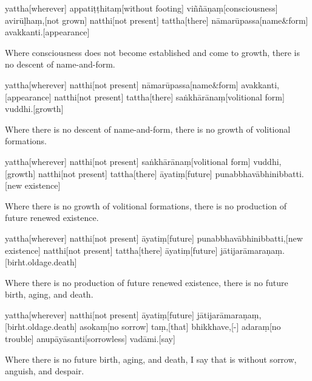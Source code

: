 \begin{samepage}
\begingl[glneveryline={\PaliGlossA,\PaliGlossB}]
yattha[wherever] appatiṭṭhitaṃ[without footing] viññāṇaṃ[consciousness] avirūḷhaṃ,[not grown] natthi[not present] tattha[there] nāmarūpassa[name\&form] avakkanti.[appearance]
\endgl
\nopagebreak
\linespread{0.5}
\begin{spacin}{0.2}
{\PaliGlossFT Where consciousness does not become established and come to growth, there is no descent of name-and-form.}
\end{spacin}
\vskip 12pt
\end{samepage}
\begin{samepage}
\begingl[glneveryline={\PaliGlossA,\PaliGlossB}]
yattha[wherever] natthi[not present] nāmarūpassa[name\&form] avakkanti,[appearance] natthi[not present] tattha[there] saṅkhārānaṃ[volitional form] vuddhi.[growth]
\endgl
\nopagebreak
\linespread{0.5}
\begin{spacin}{0.2}
{\PaliGlossFT Where there is no descent of name-and-form, there is no growth of volitional formations.}
\end{spacin}
\vskip 12pt
\end{samepage}
\begin{samepage}
\begingl[glneveryline={\PaliGlossA,\PaliGlossB}]
yattha[wherever] natthi[not present] saṅkhārānaṃ[volitional form] vuddhi,[growth] natthi[not present] tattha[there] āyatiṃ[future] punabbhavābhinibbatti.[new existence]
\endgl
\nopagebreak
\linespread{0.5}
\begin{spacin}{0.2}
{\PaliGlossFT Where there is no growth of volitional formations, there is no production of future renewed existence.}
\end{spacin}
\vskip 12pt
\end{samepage}
\begin{samepage}
\begingl[glneveryline={\PaliGlossA,\PaliGlossB}]
yattha[wherever] natthi[not present] āyatiṃ[future] punabbhavābhinibbatti,[new existence] natthi[not present] tattha[there] āyatiṃ[future] jātijarāmaraṇaṃ.[birht.oldage.death]
\endgl
\nopagebreak
\linespread{0.5}
\begin{spacin}{0.2}
{\PaliGlossFT Where there is no production of future renewed existence, there is no future birth, aging, and death.}
\end{spacin}
\vskip 12pt
\end{samepage}
\begin{samepage}
\begingl[glneveryline={\PaliGlossA,\PaliGlossB}]
yattha[wherever] natthi[not present] āyatiṃ[future] jātijarāmaraṇaṃ,[birht.oldage.death] asokaṃ[no sorrow] taṃ,[that] bhikkhave,[-] adaraṃ[no trouble] anupāyāsanti[sorrowless] vadāmi.[say]
\endgl
\nopagebreak
\linespread{0.5}
\begin{spacin}{0.2}
{\PaliGlossFT Where there is no future birth, aging, and death, I say that is without sorrow, anguish, and despair.}
\end{spacin}
\vskip 12pt
\end{samepage}
